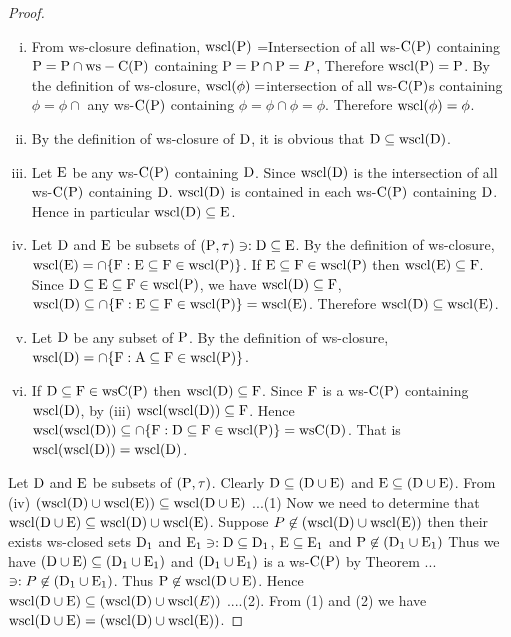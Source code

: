 \begin{proof}
\begin{enumerate}[(i)]
\item From ws-closure defination, $\mathrm{wscl}(\mathrm{P})$ =Intersection of all ws-$\mathrm{C}(\mathrm{P})$ containing $\mathrm{P} =\mathrm{P} \cap \mathrm{ws}-\mathrm{C}(\mathrm{P})$ containing $\mathrm{P}=\mathrm{P}\cap \mathrm{P} =P$, Therefore $\mathrm{wscl}(\mathrm{P})=\mathrm{P}$. By the definition of ws-closure, $\mathrm{wscl}(\phi)=$intersection of all ws-$\mathrm{C}(\mathrm{P})$s containing $\phi =\phi\cap$  any ws-$\mathrm{C}(\mathrm{P})$ containing $\phi= \phi\cap \phi=\phi$. Therefore $\mathrm{wscl}(\phi)=\phi$.

\item By the definition of ws-closure of $\mathrm{D}$, it is obvious that $\mathrm{D}\subseteq  \mathrm{wscl}(\mathrm{D})$.

\item Let $\mathrm{E}$ be any ws-$\mathrm{C}(\mathrm{P})$ containing $\mathrm{D}$. Since $\mathrm{wscl}(\mathrm{D})$ is the intersection of all ws-$\mathrm{C}(\mathrm{P})$ containing $\mathrm{D}$. $\mathrm{wscl}(\mathrm{D})$ is contained in each ws-$\mathrm{C}(\mathrm{P})$ containing $\mathrm{D}$. Hence in particular $\mathrm{wscl}(\mathrm{D})\subseteq \mathrm{E}$.

\item Let $\mathrm{D}$ and $\mathrm{E}$  be subsets of $(\mathrm{P},\tau) \ni: \mathrm{D}\subseteq \mathrm{E}$. By the definition of ws-closure, $\mathrm{wscl}(\mathrm{E})=\cap \{\mathrm{F}: \mathrm{E}\subseteq \mathrm{F}\in \mathrm{wscl}(\mathrm{P})\}$. If $\mathrm{E}\subseteq \mathrm{F}\in \mathrm{wscl}(\mathrm{P})$ then $\mathrm{wscl}(\mathrm{E})\subseteq \mathrm{F}$. Since $\mathrm{D}\subseteq \mathrm{E} \subseteq \mathrm{F}\in \mathrm{wscl}(\mathrm{P})$, we have $\mathrm{wscl}(\mathrm{D})\subseteq \mathrm{F}$, $\mathrm{wscl}(\mathrm{D})\subseteq \cap \{ \mathrm{F}: \mathrm{E}\subseteq \mathrm{F}\in \mathrm{wscl}(\mathrm{P})\}=\mathrm{wscl}(\mathrm{E})$. Therefore $\mathrm{wscl}(\mathrm{D})\subseteq \mathrm{wscl}(\mathrm{E})$.

\item Let $\mathrm{D}$ be any subset of $\mathrm{P}$. By the definition of ws-closure, $\mathrm{wscl}(\mathrm{D})=\cap \{\mathrm{F}: \mathrm{A}\subseteq \mathrm{F} \in \mathrm{wscl}(\mathrm{P})\}$.

\item If $\mathrm{D}\subseteq \mathrm{F}\in \mathrm{ws}\mathrm{C}(\mathrm{P})$ then $\mathrm{wscl}(\mathrm{D})\subseteq \mathrm{F}$. Since $\mathrm{F}$ is a ws-$\mathrm{C}(\mathrm{P})$ containing $\mathrm{wscl}(\mathrm{D})$, by (iii) $\mathrm{wscl}(\mathrm{wscl}(\mathrm{D}))\subseteq \mathrm{F}$. Hence $\mathrm{wscl}(\mathrm{wscl}(\mathrm{D}))\subseteq \cap \{\mathrm{F}: \mathrm{D}\subseteq \mathrm{F}\in \mathrm{wscl}(\mathrm{P})\}=\mathrm{ws} \mathrm{C}(\mathrm{D})$. That is $\mathrm{wscl}(\mathrm{wscl}(\mathrm{D}))=\mathrm{wscl}(\mathrm{D})$. 
\end{enumerate}

Let $\mathrm{D}$ and $\mathrm{E}$  be subsets of $(\mathrm{P},\tau)$. Clearly $\mathrm{D}\subseteq (\mathrm{D}\cup \mathrm{E})$ and $\mathrm{E}\subseteq (\mathrm{D}\cup \mathrm{E})$. From (iv) $(\mathrm{wscl}(\mathrm{D})\cup \mathrm{wscl}(\mathrm{E}))\subseteq \mathrm{wscl}(\mathrm{D}\cup \mathrm{E})$ ...(1) Now we need to determine that $\mathrm{wscl}(\mathrm{D}\cup \mathrm{E})\subseteq \mathrm{wscl}(\mathrm{D})\cup \mathrm{wscl}(\mathrm{E})$. Suppose $P\not\in (\mathrm{wscl}(\mathrm{D})\cup \mathrm{wscl}(\mathrm{E}))$ then their exists ws-closed sets $\mathrm{D}_{1}$ and $\mathrm{E}_{1}\ni: \mathrm{D}\subseteq \mathrm{D}_{1}$, $\mathrm{E}\subseteq \mathrm{E}_{1}$ and $\mathrm{P}\not\in (\mathrm{D}_{1} \cup \mathrm{E}_{1})$ Thus we have $(\mathrm{D}\cup \mathrm{E})\subseteq (\mathrm{D}_{1} \cup \mathrm{E}_{1})$ and $(\mathrm{D}_{1} \cup \mathrm{E}_{1})$ is a ws-$\mathrm{C}(\mathrm{P})$ by Theorem ... $\ni: P\not\in (\mathrm{D}_{1} \cup \mathrm{E}_{1})$. Thus $\mathrm{P}\not\in \mathrm{wscl}(\mathrm{D}\cup \mathrm{E})$. Hence $\mathrm{wscl}(\mathrm{D}\cup \mathrm{E})\subseteq (\mathrm{wscl}(\mathrm{D})\cup \mathrm{wscl}(E))$ ....(2). From (1) and (2) we have $\mathrm{wscl}(\mathrm{D}\cup \mathrm{E})=(\mathrm{wscl}(\mathrm{D})\cup \mathrm{wscl}(\mathrm{E}))$.
\end{proof}

